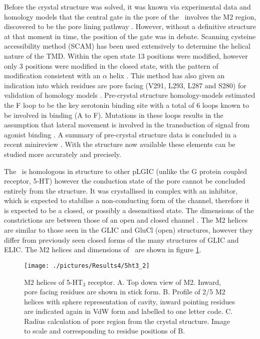 Before the crystal structure was solved, it was known via experimental data and homology models that the central gate in the pore of the \HT\ involves the M2 region, discovered to be the pore lining pathway \cite{Corringer2000}. However, without a definitive structure at that moment in time, the position of the gate was in debate. Scanning cysteine accessibility method (SCAM) has been used extensively to determine the helical nature of the TMD. Within the open state 13 positions were modified, however only 3 positions were modified in the closed state, with the pattern of modification consistent with an $\alpha$ helix \cite{Panicker2002}. This method has also given an indication into which residues are pore facing (V291, L293, L287 and S280) for validation of homology models \cite{Reeves2001}. Pre-crystal structure homology-models estimated the F loop to be the key serotonin binding site with a total of 6 loops known to be involved in binding (A to F). Mutations in these loops results in the assumption that lateral movement is involved in the transduction of signal from agonist binding \cite{Thompson2006}. A summary of pre-crystal structure data is concluded in a recent minireview \cite{Lummis2012}. With the structure now available these elements can be studied more accurately and precisely.  

The \HT\ is homologous in structure to other pLGIC (unlike the G protein coupled receptor, 5-HT) however the conduction state of the pore cannot be concluded entirely from the structure. It was crystallised in complex with an inhibitor, which is expected to stabilise a non-conducting form of the channel, therefore it is expected to be a closed, or possibly a desensitised state.  The dimensions of the constrictions are between those of an open and closed channel \cite{Haddadian2008}. The M2 helices are similar to those seen in the GLIC and GluCl (open) structures, however they differ from previously seen closed forms of the many structures of GLIC and ELIC. The M2 helices and dimensions of \HTa\ are shown in figure \ref{fig:5ht3_2}. 

\begin{figure}[H]
\begin{center}
\texttt{[image: ./pictures/Results4/5ht3\_2]}
\caption[M2 helices of 5-HT$_3$ receptor.] {M2 helices of 5-HT$_3$ receptor. A. Top down view of M2. Inward, pore facing residues are shown in stick form. B. Profile of 2/5 M2 helices with sphere representation of cavity, inward pointing residues are indicated again in VdW form and labelled to one letter code. C. Radius calculation of pore region from the crystal structure. Image to scale and corresponding to residue positions of B.}
\label{fig:5ht3_2}
\end{center}
\end{figure}

